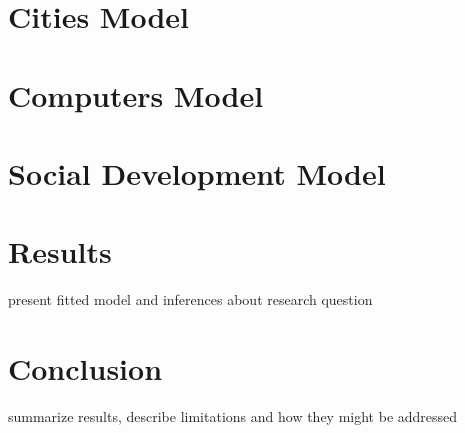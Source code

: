 \documentclass[12pt]{article}
\begin{document}
\section{Cities Model}
\section{Computers Model}
\section{Social Development Model}



\section{Results}
present fitted model and inferences about research question



\section{Conclusion}
summarize results, describe limitations and how they might be addressed



\theendnotes
\end{document}
